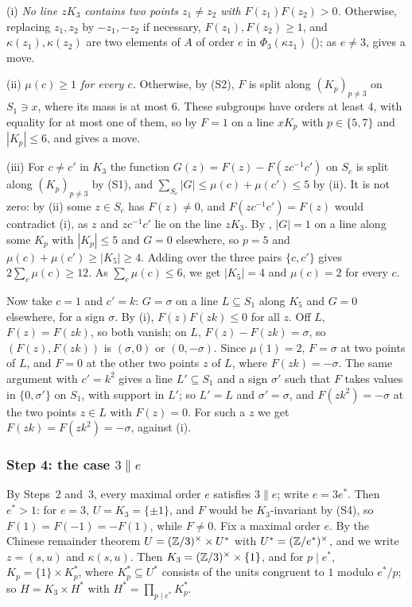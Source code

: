 (i) \emph{No line $zK_{3}$ contains two points $z_{1}\ne z_{2}$ with
$F(z_{1})F(z_{2})>0$.} Otherwise, replacing $z_{1},z_{2}$ by $-z_{1},-z_{2}$
if necessary, $F(z_{1}),F(z_{2})\ge1$, and $\kappa(z_{1}),\kappa(z_{2})$ are
two elements of $A$ of order $e$ in $\Phi_{3}(\kappa z_{1})$
(); as $e\ne3$,  gives a move.

(ii) \emph{$\mu(c)\ge1$ for every $c$.} Otherwise, by (S2), $F$ is split
along $(K_{p})_{p\ne3}$ on $S_{1}\ni x$, where its mass is at most $6$. These
subgroups have orders at least $4$, with equality for at most one of them, so
by  $F=1$ on a line $xK_{p}$ with $p\in\{5,7\}$ and
$|K_{p}|\le6$, and  gives a move.

(iii) For $c\ne c'$ in $K_{3}$ the function $G(z)=F(z)-F(zc^{-1}c')$ on
$S_{c}$ is split along $(K_{p})_{p\ne3}$ by (S1), and $\sum_{S_{c}}|G|\le
\mu(c)+\mu(c')\le5$ by (ii). It is not zero: by (ii) some $z\in S_{c}$ has
$F(z)\ne0$, and $F(zc^{-1}c')=F(z)$ would contradict (i), as $z$ and
$zc^{-1}c'$ lie on the line $zK_{3}$. By , $|G|=1$ on a line
along some $K_{p}$ with $|K_{p}|\le5$ and $G=0$ elsewhere, so $p=5$ and
$\mu(c)+\mu(c')\ge|K_{5}|\ge4$. Adding over the three pairs $\{c,c'\}$ gives
$2\sum_{c}\mu(c)\ge12$. As $\sum_{c}\mu(c)\le6$, we get $|K_{5}|=4$ and
$\mu(c)=2$ for every $c$.

Now take $c=1$ and $c'=k$: $G=\sigma$ on a line $L\subseteq S_{1}$ along
$K_{5}$ and $G=0$ elsewhere, for a sign $\sigma$. By (i), $F(z)F(zk)\le0$
for all $z$. Off $L$, $F(z)=F(zk)$, so both vanish; on $L$,
$F(z)-F(zk)=\sigma$, so $(F(z),F(zk))$ is $(\sigma,0)$ or $(0,-\sigma)$.
Since $\mu(1)=2$, $F=\sigma$ at two points of $L$, and $F=0$ at the other two
points $z$ of $L$, where $F(zk)=-\sigma$. The same argument with $c'=k^{2}$
gives a line $L'\subseteq S_{1}$ and a sign $\sigma'$ such that $F$ takes
values in $\{0,\sigma'\}$ on $S_{1}$, with support in $L'$; so $L'=L$ and
$\sigma'=\sigma$, and $F(zk^{2})=-\sigma$ at the two points $z\in L$ with
$F(z)=0$. For such a $z$ we get $F(zk)=F(zk^{2})=-\sigma$, against (i).

\subsubsection*{Step 4: the case \texorpdfstring{$3\parallel e$}{3 || e}}
By Steps~2 and~3, every maximal order $e$ satisfies $3\parallel e$; write
$e=3e^{*}$. Then $e^{*}>1$: for $e=3$, $U=K_{3}=\{\pm1\}$, and $F$ would be
$K_{3}$-invariant by (S4), so $F(1)=F(-1)=-F(1)$, while $F\ne0$. Fix a
maximal order $e$. By the Chinese remainder theorem
$U=(\mathbb{Z}/3)^{\times}\times U^{*}$ with $U^{*}=(\mathbb{Z}/e^{*})^{\times}$, and we
write $z=(s,u)$ and $\kappa(s,u)$. Then $K_{3}=(\mathbb{Z}/3)^{\times}\times\{1\}$,
and for $p\mid e^{*}$, $K_{p}=\{1\}\times K^{*}_{p}$, where $K^{*}_{p}\subseteq
U^{*}$ consists of the units congruent to $1$ modulo $e^{*}/p$; so
$H=K_{3}\times H^{*}$ with $H^{*}=\prod_{p\mid e^{*}}K^{*}_{p}$.

